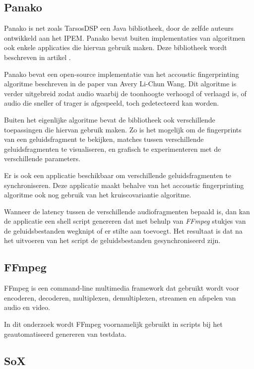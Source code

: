 \subsection{Panako}

Panako is net zoals TarsosDSP een Java bibliotheek, door de zelfde auteurs ontwikkeld aan het IPEM. Panako bevat buiten implementaties van algoritmen ook enkele applicaties die hiervan gebruik maken.  Deze bibliotheek wordt beschreven in artikel \cite{six2014panako}.

Panako bevat een open-source implementatie van het accoustic fingerprinting algoritme beschreven in de paper van Avery Li-Chun Wang\cite{Wang2003a}. Dit algoritme is verder uitgebreid zodat audio waarbij de toonhoogte verhoogd of verlaagd is, of audio die sneller of trager is afgespeeld, toch gedetecteerd kan worden.

Buiten het eigenlijke algoritme bevat de bibliotheek ook verschillende toepassingen die hiervan gebruik maken. Zo is het mogelijk om de fingerprints van een geluidsfragment te bekijken, matches tussen verschillende geluidsfragmenten te visualiseren, en grafisch te experimenteren met de verschillende parameters.

Er is ook een applicatie beschikbaar om verschillende geluidsfragmenten te synchroniseren. Deze applicatie maakt behalve van het accoustic fingerprinting algoritme ook nog gebruik van het kruiscovariantie algoritme. 

Wanneer de latency tussen de verschillende audiofragmenten bepaald is, dan kan de applicatie een shell script genereren dat met behulp van \textit{FFmpeg} stukjes van de geluidsbestanden wegknipt of er stilte aan toevoegt. Het resultaat is dat na het uitvoeren van het script de geluidsbestanden gesynchroniseerd zijn.

\subsection{FFmpeg}

FFmpeg is een command-line multimedia framework dat gebruikt wordt voor encoderen, decoderen, multiplexen, demultiplexen, streamen en afspelen van audio en video. \cite{kollarconfiguration}

In dit onderzoek wordt FFmpeg voornamelijk gebruikt in scripts bij het geautomatiseerd genereren van testdata.

\subsection{SoX}

